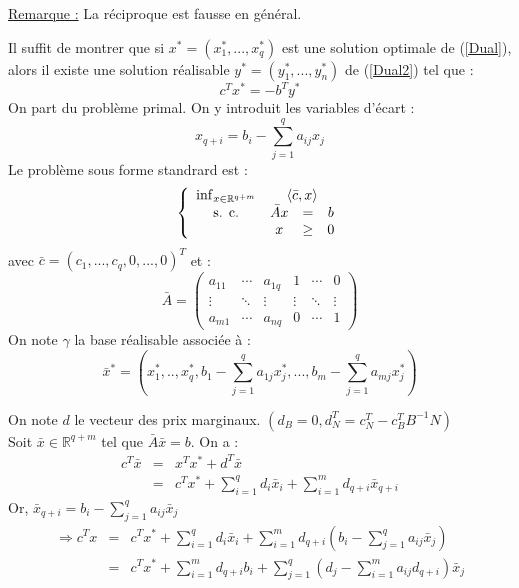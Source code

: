 
\underline{Remarque :} La réciproque est fausse en général.


\begin{dem}
Il suffit de montrer que si $x^*=(x_1^*,...,x_q^*)$ est une solution optimale de (\ref{Dual}), alors il existe une solution réalisable $y^*=(y_1^*,...,y_n^*)$ de (\ref{Dual2}) tel que : \[c^Tx^*=-b^Ty^*\]
On part du problème primal. On y introduit les variables d'écart :
	\[x_{q+i}=b_i-\sum_{j=1}^q a_{ij}x_j\]
Le problème sous forme standrard est :
 \begin{equation}
	\left\{ \begin{array}{c c c c} \inf_{x\in\mathbb{R}^{q+m}} & \multicolumn{3}{c}{\langle \bar{c},x\rangle} \\
						\text{s. c.}     & \bar{A}x &=& b \\
								& x &\geq& 0
	\end{array} \right.
\end{equation}
avec $\bar{c}=(c_1,...,c_q,0,...,0)^T$ et :
\[\bar{A}=\begin{pmatrix} a_{11} & \cdots & a_{1q} & 1 & \cdots & 0 \\
			    \vdots & \ddots & \vdots & \vdots & \ddots & \vdots \\
			    a_{m1} & \cdots & a_{nq} & 0 & \cdots & 1 \end{pmatrix}\]
On note $\gamma$ la base réalisable associée à :
	\[\bar{x}^*=\left(x_1^*,..,x^*_q,b_1-\sum_{j=1}^q a_{1j}x_j^*,..., b_m-\sum_{j=1}^q a_{mj}x_j^*\right)\]

On note $d$ le vecteur des prix marginaux. $(d_B=0, d_N^T=c_N^T-c_B^TB^{-1}N)$\\
Soit $\bar{x}\in\mathbb{R}^{q+m}$ tel que $\bar{A}\bar{x}=b$. On a : 
\begin{eqnarray*}
	c^T\bar{x}&=&x^Tx^* + d^T\bar{x} \\
		&=& c^Tx^* + \sum_{i=1}^q d_i\bar{x}_i + \sum_{i=1}^m d_{q+i}\bar{x}_{q+i}
\end{eqnarray*}
Or, $\bar{x}_{q+i}=b_i-\sum_{j=1}^q a_{ij}\bar{x}_j$
\begin{eqnarray*}
	\Rightarrow c^Tx&=&c^Tx^* + \sum_{i=1}^q d_i\bar{x}_i + \sum_{i=1}^m d_{q+i}(b_i-\sum_{j=1}^q a_{ij}\bar{x}_j) \\
			&=&c^Tx^* + \sum_{i=1}^m d_{q+i}b_i + \sum_{j=1}^q \left(d_j-\sum_{i=1}^m a_{ij}d_{q+i}\right)\bar{x}_j
\end{eqnarray*}


\end{dem}
